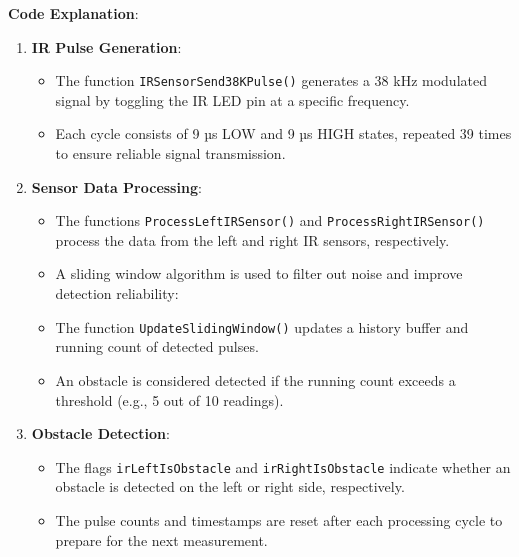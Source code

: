\textbf{Code Explanation}:
\begin{enumerate}
	\item \textbf{IR Pulse Generation}:
	\begin{itemize}
		\item The function \texttt{IRSensorSend38KPulse()} generates a 38 kHz modulated signal by toggling the IR LED pin at a specific frequency.
		\item Each cycle consists of 9 µs LOW and 9 µs HIGH states, repeated 39 times to ensure reliable signal transmission.
	\end{itemize}
	\item \textbf{Sensor Data Processing}:
	\begin{itemize}
		\item The functions \texttt{ProcessLeftIRSensor()} and \texttt{ProcessRightIRSensor()} process the data from the left and right IR sensors, respectively.
		\item A sliding window algorithm is used to filter out noise and improve detection reliability:
		\item The function \texttt{UpdateSlidingWindow()} updates a history buffer and running count of detected pulses. 
		\item An obstacle is considered detected if the running count exceeds a threshold (e.g., 5 out of 10 readings).
	\end{itemize}
	\item  \textbf{Obstacle Detection}:
	\begin{itemize}
		\item The flags \texttt{irLeftIsObstacle} and \texttt{irRightIsObstacle} indicate whether an obstacle is detected on the left or right side, respectively.		
		\item The pulse counts and timestamps are reset after each processing cycle to prepare for the next measurement.
	\end{itemize}
\end{enumerate}
